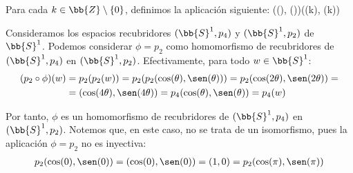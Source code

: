 \begin{ejemplo}
    Para cada $k\in \bb{Z}\setminus \{0\}$, definimos la aplicación siguiente:
        {(\cos(\theta), \sen(\theta))}{(\cos(k\theta), \sen(k\theta))}
    
    Consideramos los espacios recubridores $(\bb{S}^1,p_4)$ y $(\bb{S}^1,p_2)$ de $\bb{S}^1$. Podemos considerar $\phi=p_2$ como homomorfismo de recubridores de $(\bb{S}^1,p_4)$ en $(\bb{S}^1,p_2)$. Efectivamente, para todo $w\in \bb{S}^1$:
    \begin{align*}
        (p_2\circ \phi)(w) &= p_2(p_2(w)) = p_2(p_2(\cos(\theta), \sen(\theta))) = p_2(\cos(2\theta), \sen(2\theta)) =\\&= (\cos(4\theta), \sen(4\theta)) = p_4(\cos(\theta), \sen(\theta)) = p_4(w)
    \end{align*}

    Por tanto, $\phi$ es un homomorfismo de recubridores de $(\bb{S}^1,p_4)$ en $(\bb{S}^1,p_2)$. Notemos que, en este caso, no se trata de un isomorfismo, pues la aplicación $\phi=p_2$ no es inyectiva:
    \begin{gather*}
        p_2(\cos(0), \sen(0)) = (\cos(0), \sen(0)) = (1,0) = p_2(\cos(\pi), \sen(\pi))
    \end{gather*}
\end{ejemplo}


